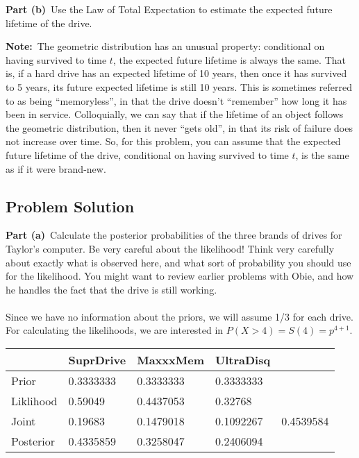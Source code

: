 \documentclass[12pt]{article}
\theoremstyle{definition}
\begin{document}
\bigskip
\noindent
{\bf Part (b)}\ Use the Law of Total Expectation to estimate the expected future lifetime of the drive.

\bigskip
\noindent
{\bf Note:}\ The geometric distribution has an unusual property: conditional on having survived to time $t$, the expected future lifetime is always the same. That is, if a hard drive has an expected lifetime of 10 years, then once it has survived to 5 years, its future expected lifetime is still 10 years. This is sometimes referred to as being ``memoryless'', in that the drive doesn't ``remember'' how long it has been in service. Colloquially, we can say that if the lifetime of an object follows the geometric distribution, then it never ``gets old'', in that its risk of failure does not increase over time. So, for this problem, you can assume that the expected future lifetime of the drive, conditional on having survived to time $t$, is the same as if it were brand-new.


\newpage
\subsection*{Problem Solution}

\noindent
{\bf Part (a)}\ Calculate the posterior probabilities of the three brands of drives for Taylor's computer. Be very careful about the likelihood! Think very carefully about exactly what is observed here, and what sort of probability you should use for the likelihood. You might want to review earlier problems with Obie, and how he handles the fact that the drive is still working.\\\\
Since we have no information about the priors, we will assume 1/3 for each drive. For calculating the likelihoods, we are interested in $P(X>4) = S(4) = p^{4 + 1}$.\\

\begin{tabular}{lllll}
           & SuprDrive  & MaxxxMem  & UltraDisq &           \\
\hline
Prior      &   0.3333333   &   0.3333333   &   0.3333333   &\\
Liklihood  &   0.59049   &   0.4437053   &   0.32768   &\\
Joint      &   0.19683   &   0.1479018   &   0.1092267   &   0.4539584\\
Posterior  &   0.4335859   &   0.3258047   &   0.2406094   &\\
\hline
\end{tabular}
\end{document}
